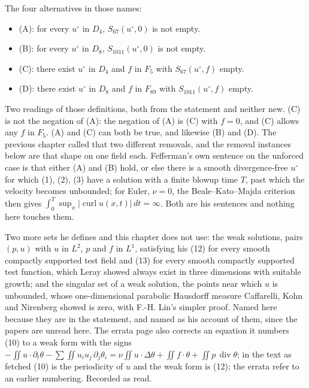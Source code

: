 The four alternatives in those names:

\begin{itemize}
\item (A): for every $u^\circ$ in $D_4$, $S_{67}(u^\circ, 0)$ is not empty.
\item (B): for every $u^\circ$ in $D_8$, $S_{1011}(u^\circ, 0)$ is not empty.
\item (C): there exist $u^\circ$ in $D_4$ and $f$ in $F_5$ with $S_{67}(u^\circ,f)$ empty.
\item (D): there exist $u^\circ$ in $D_8$ and $f$ in $F_{89}$ with $S_{1011}(u^\circ,f)$ empty.
\end{itemize}

Two readings of those definitions, both from the statement and neither new. (C) is not the negation
of (A): the negation of (A) is (C) with $f = 0$, and (C) allows any $f$ in $F_5$. (A) and (C) can
both be true, and likewise (B) and (D). The previous chapter called that two different removals, and
the removal instances below are that shape on one field each. Fefferman's own sentence on the
unforced case is that either (A) and (B) hold, or else there is a smooth divergence-free $u^\circ$
for which (1), (2), (3) have a solution with a finite blowup time $T$, past which the velocity becomes
unbounded; for Euler, $\nu = 0$, the Beale--Kato--Majda criterion then gives
$\int_0^T \sup_x |\operatorname{curl} u(x,t)|\,dt = \infty$. Both are his sentences and nothing here
touches them.

Two more sets he defines and this chapter does not use: the weak solutions, pairs $(p,u)$ with $u$
in $L^2$, $p$ and $f$ in $L^1$, satisfying his (12) for every smooth compactly supported test field
and (13) for every smooth compactly supported test function, which Leray showed always exist in three
dimensions with suitable growth; and the singular set of a weak solution, the points near which $u$ is
unbounded, whose one-dimensional parabolic Hausdorff measure Caffarelli, Kohn and Nirenberg showed
is zero, with F.-H. Lin's simpler proof. Named here because they are in the statement, and named as
his account of them, since the papers are unread here. The errata page also corrects an equation it
numbers (10) to a weak form with the signs
$-\iint u\cdot\partial_t\theta - \sum\iint u_iu_j\,\partial_j\theta_i = \nu\iint u\cdot\Delta\theta
+ \iint f\cdot\theta + \iint p\,\operatorname{div}\theta$; in the text as fetched (10) is the
periodicity of $u$ and the weak form is (12); the errata refer to an earlier numbering. Recorded as
read.

